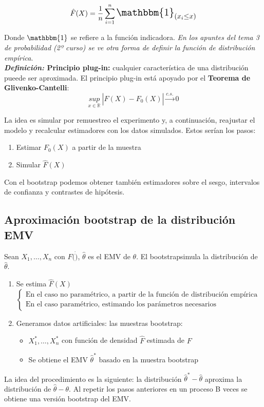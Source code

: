 $$\hat{F}(X)=\frac{1}{n}\sum_{i=1}^{n}\text{\Large{$\mathbbm{1}_{(x_i\leq x)}$}}$$

Donde $\mathbbm{1}$ se refiere a la función indicadora. \textit{En los apuntes del tema 3 de probabilidad (2º curso) se ve otra forma de definir la función de distribución empírica}.\\

\textbf{\textit{Definición:} Principio plug-in:} cualquier característica de una distribución pueede ser aproximada. El principio plug-in está apoyado por el \textbf{Teorema de Glivenko-Cantelli}:
$$\underset{x\in\mathbb{R}}{sup}\ |\hat F(X)-F_0(X)|\overset{c.s.}{\longrightarrow}0$$

La idea es simular por remuestreo el experimento y, a continuación, reajustar el modelo y recalcular estimadores con los datos simulados. Estos serían los pasos:
\begin{enumerate}
    \item Estimar $F_0(X)$ a partir de la muestra
    \item Simular $\hat F(X)$
\end{enumerate}
Con el bootstrap podemos obtener también estimadores sobre el sesgo, intervalos de confianza y contrastes de hipótesis.

\subsection{Aproximación bootstrap de la distribución EMV}

Sean $X_1,\dots,X_n$ con $F(\dot)$, $\hat\theta$ es el EMV de $\theta$. El bootstrapsimula la distribución de $\hat\theta$.
\begin{enumerate}
    \item Se estima $\hat F(X)$$\begin{cases}
        \text{En el caso no paramétrico, a partir de la función de distribución empírica}\\
        \text{En el caso paramétrico, estimando los parámetros necesarios}
    \end{cases}$
    \item Generamos datos artificiales: las muestras bootstrap:
        \begin{itemize}
            \item $X_1^*,\dots,X_n^*$ con función de densidad $\hat F$ estimada de $F$ 
            \item Se obtiene el EMV $\hat\theta^*$ basado en la muestra bootstrap
        \end{itemize}
\end{enumerate}

La idea del procedimiento es la siguiente: la distribución $\hat\theta^*-\hat\theta$ aproxima la distribución de $\hat\theta-\theta$. Al repetir los pasos anteriores en un proceso B veces se obtiene una versión bootstrap del EMV.


